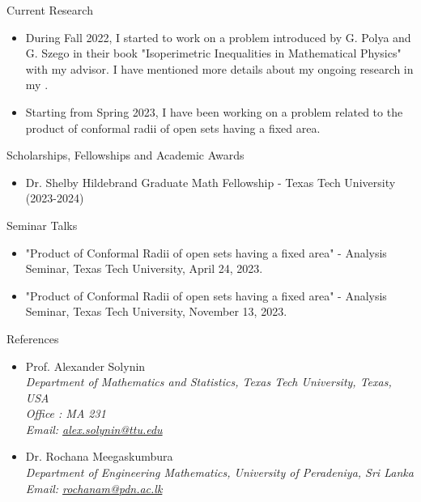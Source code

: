 \documentclass{resume} %
\begin{document}
\begin{rSection}{Current Research}

\begin{itemize}


    \item During Fall 2022, I started to work on a problem introduced by G. Polya and G. Szego in their book "Isoperimetric Inequalities in Mathematical Physics" with my advisor. I have mentioned more details about my ongoing research in my \href{https://drive.google.com/file/d/1q9z3J-2oMmWdiA1qH06dD8iBnyTRSwW0/view?usp=share_link}{\color{red}{research statement}}.

    \item Starting from Spring 2023, I have been working on a problem related to the product of conformal radii of open sets having a fixed area. 
\end{itemize}

\end{rSection}

\begin{rSection}{Scholarships, Fellowships and Academic Awards}
\begin{itemize}
    \item Dr. Shelby Hildebrand Graduate Math Fellowship - Texas Tech University (2023-2024)
\end{itemize}
\end{rSection}


\begin{rSection}{Seminar Talks}
    \begin{itemize}
        \item "Product of Conformal Radii of open sets having a fixed area" - Analysis Seminar, Texas Tech University, April 24, 2023.
        \item "Product of Conformal Radii of open sets having a fixed area" - Analysis Seminar, Texas Tech University, November 13, 2023.
    \end{itemize}
\end{rSection}

\begin{rSection}{References}
\begin{itemize}
    \item Prof. Alexander Solynin
    \\ \textit{Department of Mathematics and Statistics, Texas Tech University, Texas, USA \\ Office : MA 231 \\
    Email: \href{mailto:alex.solynin@ttu.edu}{alex.solynin@ttu.edu}}

    \item Dr. Rochana Meegaskumbura
    \\ \textit{Department of Engineering Mathematics, University of Peradeniya, Sri Lanka 
    \\ Email: \href{mailto:rochanam@pdn.ac.lk}{rochanam@pdn.ac.lk}}
\end{itemize}
    
\end{rSection}
\end{document}
